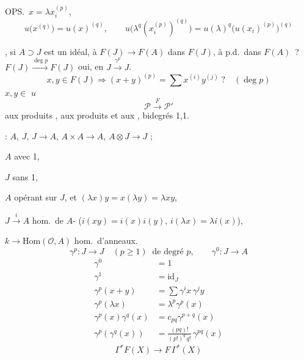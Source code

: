 \documentclass[11pt,a4paper]{article}
\begin{document}
OPS.\ $x = \lambda x_i^{(p)}$,
\[
u\bigl(x^{(q)}\bigr) = u(x)^{(q)}, \qquad
u\bigl(\lambda^q(x_i^{(p)})^{(q)}\bigr) = u(\lambda)^q\bigl(u(x_i)^{(p)}\bigr)^{(q)}
\]

, si $A \supset J$ est un idéal,  à  \ill{} $F(J) \to F(A)$  dans $F(J)$, à p.d.\ dans $F(A)$~?
$F(J) \xrightarrow{\deg p} F(J)$ oui, en  $J \xrightarrow{\gamma^p} J$.
\struck{\ill{}}   
\[
x,y\in F(J) \Longrightarrow (x+y)^{(p)} = \textstyle\sum x^{(i)}y^{(j)}\;? \quad (\deg p)
\]
$x,y\in$ \; $u$
\[
\mathcal{P} \xrightarrow{\;F\;} \mathcal{P}'
\]
 aux produits ,  aux produits et aux , \qquad bidegrés 1,1.

  : $A$, $J$, \quad $J \to A$, \quad $A\times A \to A$, \quad $A\otimes J \to J$ ;

$A$  avec 1,

$J$  sans 1,

$A$ opérant sur $J$, et $(\lambda x)y = x(\lambda y) = \lambda xy$,

$J \xrightarrow{\;i\;} A$ hom.\ de $A$- ($i(xy) = i(x)i(y)$, $i(\lambda x) = \lambda i(x)$),

$k \to \mathrm{Hom}(\mathcal{O},A)$ hom.\ d'anneaux.
\[
\gamma^p : J \to J \quad (p\ge1) \;\; \text{de degré } p, \qquad \gamma^0 : J \to A
\]
\[
\begin{aligned}
\gamma^0 &= 1 \\
\gamma^1 &= \mathrm{id}_J \\
\gamma^p(x+y) &= \textstyle\sum \gamma^ix\,\gamma^jy \\
\gamma^p(\lambda x) &= \lambda^p\gamma^p(x) \\
\gamma^p(x)\gamma^q(x) &= c_{pq}\gamma^{p+q}(x) \\
\gamma^p(\gamma^q(x)) &= \frac{(pq)!}{(p!)^q\,q!}\,\gamma^{pq}(x)
\end{aligned}
\]
\[
\Gamma^*F(X) \longrightarrow F\,\Gamma^*(X)
\]
\end{document}
